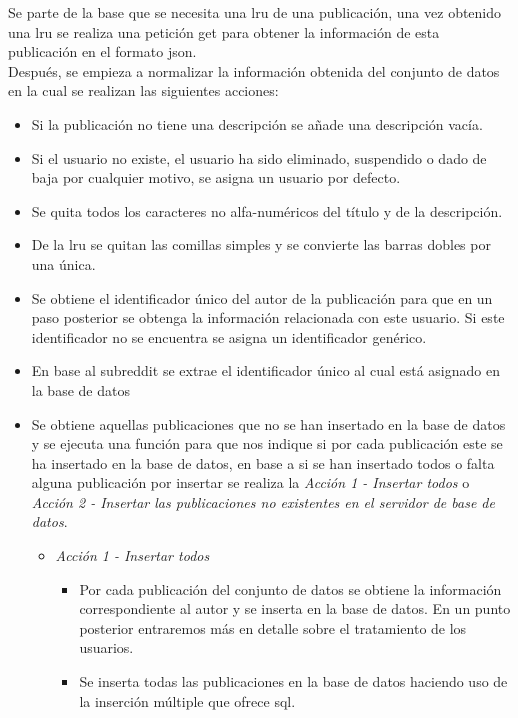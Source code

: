 \documentclass[../../main.tex]{subfiles}
\begin{document}
Se parte de la base que se necesita una \gls{lru} de una publicación, una vez obtenido una \gls{lru} se realiza una petición \gls{get} para obtener la información de esta publicación en el formato \gls{json}.  \\

Después, se empieza a normalizar la información obtenida del conjunto de datos en la cual se realizan las siguientes acciones:

\begin{itemize}
    \item Si la publicación no tiene una descripción se añade una descripción vacía.
    \item Si el usuario no existe, el usuario ha sido eliminado, suspendido o dado de baja por cualquier motivo, se asigna un usuario por defecto.
    \item Se quita todos los caracteres no alfa-numéricos del título y de la descripción.
    \item De la \gls{lru} se quitan las comillas simples y se convierte las barras dobles por una única.
    \item Se obtiene el identificador único del autor de la publicación para que en un paso posterior se obtenga la información relacionada con este usuario. Si este identificador no se encuentra se asigna un identificador genérico.
    \item En base al \gls{subreddit} se extrae el identificador único al cual está asignado en la base de datos
    \item Se obtiene aquellas publicaciones que no se han insertado en la base de datos y se ejecuta una función para que nos indique si por cada publicación este se ha insertado en la base de datos, en base a si se han insertado todos o falta alguna publicación por insertar se realiza la \textit{Acción 1 - Insertar todos} o \textit{Acción 2 - Insertar las publicaciones no existentes en el servidor de base de datos}.
    \begin{itemize}
        \item \textit{Acción 1 - Insertar todos}
        \begin{itemize}
            \item Por cada publicación del conjunto de datos se obtiene la información correspondiente al autor y se inserta en la base de datos. En un punto posterior entraremos más en detalle sobre el tratamiento de los usuarios.
            \item Se inserta todas las publicaciones en la base de datos haciendo uso de la inserción múltiple que ofrece \gls{sql}.

\end{itemize}
\end{itemize}
\end{itemize}
\end{document}
